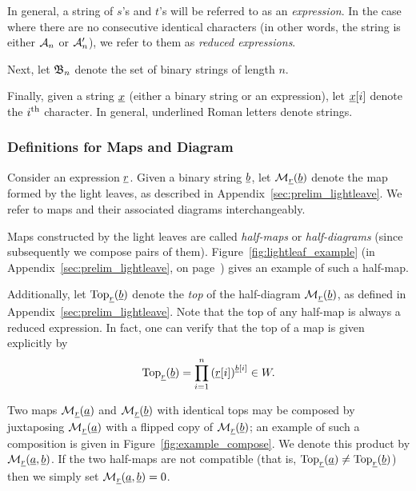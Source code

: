 In general, a string of $s$'s and $t$'s will be referred to as an \emph{expression}.  In the case where there are no consecutive identical characters (in other words, the string is either $\AA_n$ or $\AA_n'$), we refer to them as \emph{reduced expressions}.

Next, let $\BB_n$ denote the set of binary strings of length $n$.

Finally, given a string $\ul x$ (either a binary string or an expression), let $\ul x[i]$ denote the $i\th$ character.  In general, underlined Roman letters denote strings.

\subsubsection{Definitions for Maps and Diagram}
Consider an expression $\ul r$.  Given a binary string $\ul b$, let $\MM_{\ul r}(\ul b)$ denote the map formed by the light leaves, as described in Appendix~\ref{sec:prelim_lightleave}.  We refer to maps and their associated diagrams interchangeably.

Maps constructed by the light leaves are called \emph{half-maps} or \emph{half-diagrams} (since subsequently we compose pairs of them).  Figure~\ref{fig:lightleaf_example} (in Appendix~\ref{sec:prelim_lightleave}, on page~\pageref{sec:prelim_lightleave}) gives an example of such a half-map.

Additionally, let $\Top_{\ul r}(\ul b)$ denote the \emph{top} of the half-diagram $\MM_{\ul r}(\ul b)$, as defined in Appendix~\ref{sec:prelim_lightleave}.  
Note that the top of any half-map is always a reduced expression.  In fact, one can verify that the top of a map is given explicitly by
\begin{equation}
	\Top_{\ul r}(\ul b) = \prod_{i=1}^n \left( \ul r[i] \right)^{\ul b[i]} \in W.
	\label{eq:top}
\end{equation}

Two maps $\MM_{\ul r}(\ul a)$ and $\MM_{\ul r}(\ul b)$ with identical tops may be composed by juxtaposing $\MM_{\ul r}(\ul a)$ with a flipped copy of $\MM_{\ul r}(\ul b)$; an example of such a composition is given in Figure~\ref{fig:example_compose}.  We denote this product by $\MM_{\ul r}(\ul a, \ul b)$.  If the two half-maps are not compatible (that is, $\Top_{\ul r}(\ul a) \neq \Top_{\ul r}(\ul b)$) then we simply set $\MM_{\ul r}(\ul a, \ul b) = 0$.

